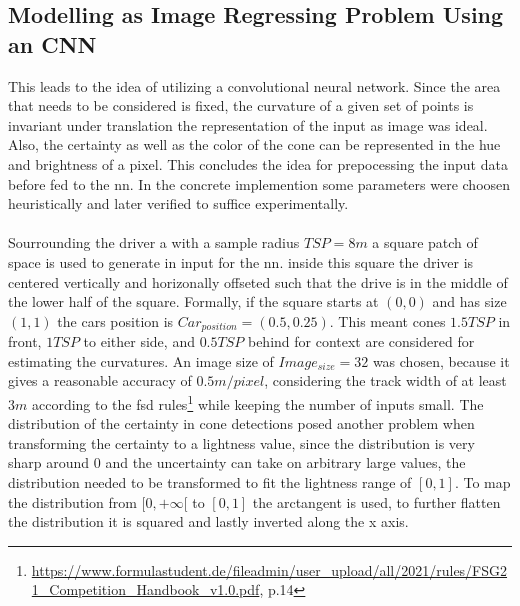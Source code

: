 \subsection{Modelling as Image Regressing Problem Using an CNN}
This leads to the idea of utilizing a convolutional neural network. Since the area that needs to be considered is fixed, the curvature of a given set of points is invariant under translation the representation of the input as image was ideal. Also, the certainty as well as the color of the cone can be represented in the hue and brightness of a pixel. This concludes the idea for prepocessing the input data before fed to the \ac{nn}. In the concrete implemention some parameters were choosen heuristically and later verified to suffice experimentally.\\
\\
Sourrounding the driver a with a sample radius $TSP = 8m$ a square patch of space is used to generate in input for the \ac{nn}. inside this square the driver is centered vertically and horizonally offseted such that the drive is in the middle of the lower half of the square. Formally, if the square starts at $(0,0)$ and has size $(1,1)$ the cars position is $Car_{position}=(0.5,0.25)$. This meant cones $1.5TSP$ in front, $1TSP$ to either side, and $0.5TSP$ behind for context are considered for estimating the curvatures. An image size of $Image_{size}=32$ was chosen, because it gives a reasonable accuracy of $0.5m/pixel$, considering the track width of at least $3m$ according to the \ac{fsd} rules\footnote{\url{https://www.formulastudent.de/fileadmin/user_upload/all/2021/rules/FSG21_Competition_Handbook_v1.0.pdf}, p.14} while keeping the number of inputs small. The distribution of the certainty in cone detections posed another problem when transforming the certainty to a lightness value, since the distribution is very sharp around 0 and the uncertainty can take on arbitrary large values, the distribution needed to be transformed to fit the lightness range of $[0,1]$. To map the distribution from $[0,+\infty[$ to $[0,1]$ the arctangent is used, to further flatten the distribution it is squared and lastly inverted along the x axis. 

